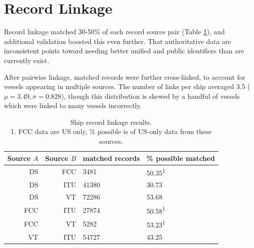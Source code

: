 


\section{Record Linkage}

Record linkage matched 30-50\% of each record source pair (Table \ref{table:ships-record-linkage-results}), and additional validation boosted this even further. That authoritative data are inconsistent points toward needing better unified and public identifiers than are currently exist.

After pairwise linkage, matched records were further cross-linked, %
 to account for vessels appearing in multiple sources. The number of links per ship averaged 3.5 ($\mu = 3.49, \sigma = 0.828$), %
though this distribution is skewed by a handful of vessels which were linked to many vessels incorrectly. 
\begin{table}[htbp]
  \begin{tabular}{rrll} %
    \hline
    Source $A$ & Source $B$ & matched records & \% possible matched \\
    \hline
     DS & FCC &  3481 & 50.35\textsuperscript{1} \\
     DS & ITU & 41380 & 30.73 \\
     DS &  VT & 72286 & 53.68 \\
    FCC & ITU & 27874 & 50.58\textsuperscript{1} \\
    FCC &  VT &  5282 & 53.23\textsuperscript{1} \\
     VT & ITU & 54727 & 43.25 \\
  \end{tabular}
  \caption[Ship record linkage results]{Ship record linkage results. \\
    1. FCC data are US only, \% possible is of US-only data from these sources.}
  \label{table:ships-record-linkage-results}
\end{table}

